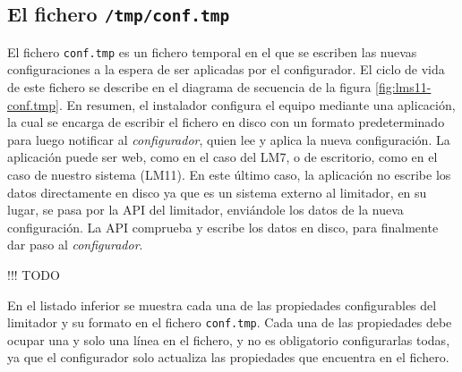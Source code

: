 
\subsection{El fichero \texttt{/tmp/conf.tmp}} \label{append:F_conf.tmp}

El fichero \verb|conf.tmp| es un fichero temporal en el que se escriben las nuevas configuraciones a la espera de ser aplicadas por el configurador. El ciclo de vida de este fichero se describe en el diagrama de secuencia de la figura \ref{fig:lms11-conf.tmp}. En resumen, el instalador configura el equipo mediante una aplicación, la cual se encarga de escribir el fichero en disco con un formato predeterminado para luego notificar al \textit{configurador}, quien lee y aplica la nueva configuración. La aplicación puede ser web, como en el caso del LM7, o de escritorio, como en el caso de nuestro sistema (LM11). En este último caso, la aplicación no escribe los datos directamente en disco ya que es un sistema externo al limitador, en su lugar, se pasa por la API del limitador, enviándole los datos de la nueva configuración. La API comprueba y escribe los datos en disco, para finalmente dar paso al \textit{configurador}.

!!! TODO

En el listado inferior se muestra cada una de las propiedades configurables del limitador y su formato en el fichero  \verb|conf.tmp|. Cada una de las propiedades debe ocupar una y solo una línea en el fichero, y no es obligatorio configurarlas todas, ya que el configurador solo actualiza las propiedades que encuentra en el fichero.

